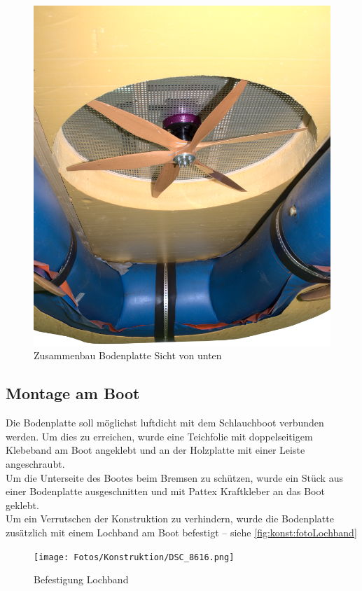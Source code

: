 \begin{figure}[H]
    \centering
    \includegraphics[width=.99\textwidth]{Fotos/Konstruktion/DSC_8600.png}
    \caption{Zusammenbau Bodenplatte Sicht von unten}    
\end{figure}

\subsection{Montage am Boot}
Die Bodenplatte soll möglichst luftdicht mit dem Schlauchboot verbunden werden. Um dies zu erreichen, wurde eine Teichfolie mit doppelseitigem Klebeband am Boot angeklebt und an der Holzplatte mit einer Leiste angeschraubt.\\
Um die Unterseite des Bootes beim Bremsen zu schützen, wurde ein Stück aus einer Bodenplatte ausgeschnitten und mit Pattex Kraftkleber an das Boot geklebt.\\
Um ein Verrutschen der Konstruktion zu verhindern, wurde die Bodenplatte zusätzlich mit einem Lochband am Boot befestigt -- siehe \autoref{fig:konst:fotoLochband}
\begin{figure}[H]
    \centering
    \texttt{[image: Fotos/Konstruktion/DSC\_8616.png]}
    \caption{Befestigung Lochband\label{fig:konst:fotoLochband}}    
\end{figure}
 

